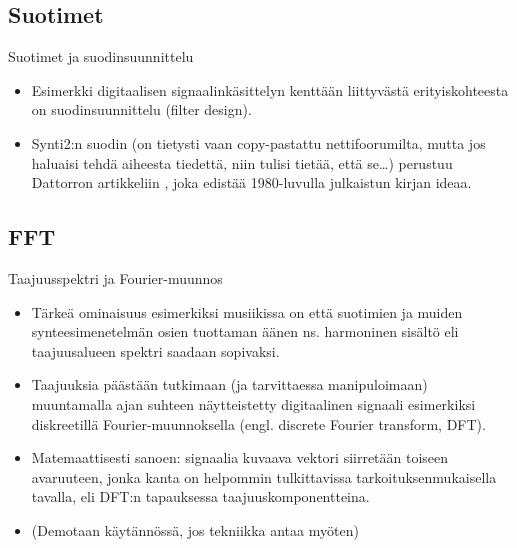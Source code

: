 \documentclass[pdf,handout,10pt]{beamer}
\begin{document}
\subsection{Suotimet}
\begin{frame}{Suotimet ja suodinsuunnittelu}

  \begin{itemize}
    \item
  Esimerkki digitaalisen signaalinkäsittelyn kenttään liittyvästä
  erityiskohteesta on suodinsuunnittelu (filter design).
    \item
  Synti2:n suodin (on tietysti vaan copy-pastattu nettifoorumilta,
  mutta jos haluaisi tehdä aiheesta tiedettä, niin tulisi tietää, että
  se\ldots) perustuu Dattorron artikkeliin \cite{dattorro1997effect},
  joka edistää 1980-luvulla julkaistun kirjan \cite{Chamberlin1980}
  ideaa.
  \end{itemize}

\end{frame}

\subsection{FFT}

\begin{frame}{Taajuusspektri ja Fourier-muunnos}
  \begin{itemize}
\item
  Tärkeä ominaisuus esimerkiksi musiikissa on että suotimien ja muiden
  synteesimenetelmän osien tuottaman äänen ns. harmoninen sisältö eli
  taajuusalueen spektri saadaan sopivaksi.
\item
  Taajuuksia päästään
  tutkimaan (ja tarvittaessa manipuloimaan) muuntamalla ajan suhteen
  näytteistetty digitaalinen signaali esimerkiksi diskreetillä
  Fourier-muunnoksella (engl. discrete Fourier transform,
  DFT).
\item
  Matemaattisesti sanoen: signaalia kuvaava vektori siirretään
  toiseen avaruuteen, jonka kanta on helpommin tulkittavissa
  tarkoituksenmukaisella tavalla, eli DFT:n tapauksessa
  taajuuskomponentteina.
\item[]
  (Demotaan käytännössä, jos tekniikka antaa myöten)
  \end{itemize}
  
\end{frame}
\end{document}
